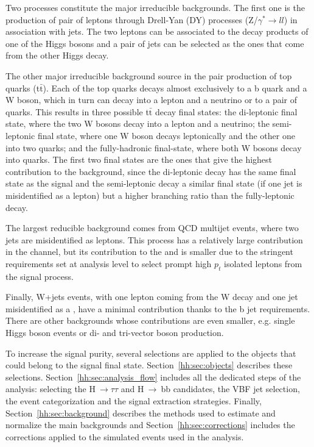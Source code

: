 \documentclass[../main.tex]{subfiles}
\begin{document}
Two processes constitute the major irreducible backgrounds. The first one is the production of pair of leptons through Drell-Yan (DY) processes (Z/$\gamma^*\to ll$) in association with jets. The two leptons can be associated to the decay products of one of the Higgs bosons and a pair of jets can be selected as the ones that come from the other Higgs decay. 

The other major irreducible background source in the pair production of top quarks (t$\bar{\text{t}}$). Each of the top quarks decays almost exclusively to a b quark and a W boson, which in turn can decay into a lepton and a neutrino or to a pair of quarks. This results in three possible t$\bar{\text{t}}$ decay final states: the di-leptonic final state, where the two W bosons decay into a lepton and a neutrino; the semi-leptonic final state, where one W boson decays leptonically and the other one into two quarks; and the fully-hadronic final-state, where both W bosons decay into quarks. The first two final states are the ones that give the highest contribution to the background, since the di-leptonic decay has the same final state as the signal and the semi-leptonic decay a similar final state (if one jet is misidentified as a lepton) but a higher branching ratio than the fully-leptonic decay.

The largest reducible background comes from QCD multijet events, where two jets are misidentified as leptons. This process has a relatively large contribution in the \tauh\tauh{} channel, but its contribution to the \taue\tauh{} and \taumu\tauh is smaller due to the stringent requirements set at analysis level to select prompt high $p_t$ isolated leptons from the signal process.

Finally, W+jets events, with one lepton coming from the W decay and one jet misidentified as a \tauh{}, have a minimal contribution thanks to the b jet requirements. There are other backgrounds whose contributions are even smaller, e.g. single Higgs boson events or di- and tri-vector boson production.

To increase the signal purity, several selections are applied to the objects that could belong to the signal final state. Section~\ref{hh:sec:objects} describes these selections. Section~\ref{hh:sec:analysis_flow} includes all the dedicated steps of the analysis: selecting the H$~\to\tau\tau$ and H$~\to~$bb candidates, the VBF jet selection, the event categorization and the signal extraction strategies. Finally, Section~\ref{hh:sec:background} describes the methods used to estimate and normalize the main backgrounds and Section~\ref{hh:sec:corrections} includes the corrections applied to the simulated events used in the analysis.
\end{document}
